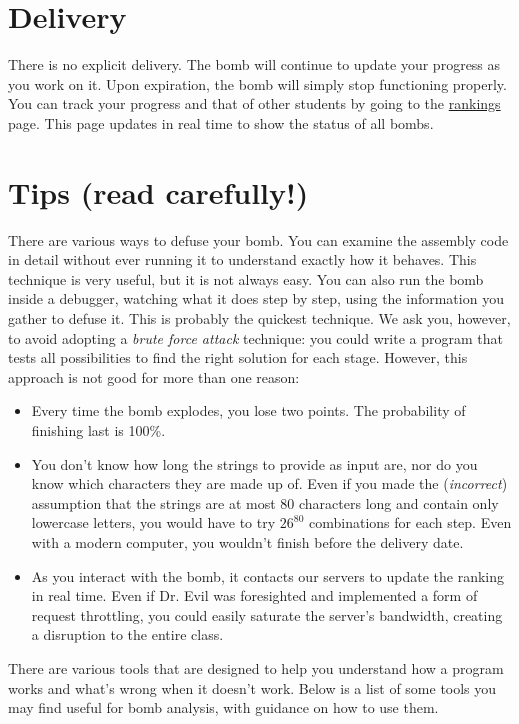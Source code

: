 \documentclass[a4paper,12pt]{report}  %
\begin{document}
\section{Delivery}
There is no explicit delivery.
The bomb will continue to update your progress as you work on it.
Upon expiration, the bomb will simply stop functioning properly.
You can track your progress and that of other students by going to the \href{https://bombs.alessandropellegrini.it/2425}{rankings} page.
This page updates in real time to show the status of all bombs.

\section{Tips (read carefully!)} \label{homework:tips}
There are various ways to defuse your bomb.
You can examine the assembly code in detail without ever running it to understand exactly how it behaves.
This technique is very useful, but it is not always easy.
You can also run the bomb inside a debugger, watching what it does step by step, using the information you gather to defuse it.
This is probably the quickest technique.
We ask you, however, to avoid adopting a \textit{brute force attack} technique: you could write a program that tests all possibilities to find the right solution for each stage.
However, this approach is not good for more than one reason:
\begin{itemize}
    \item Every time the bomb explodes, you lose two points. The probability of finishing last is 100\%.
    \item You don't know how long the strings to provide as input are, nor do you know which characters they are made up of. Even if you made the (\textit{incorrect}) assumption that the strings are at most 80 characters long and contain only lowercase letters, you would have to try $26^{80}$ combinations for each step. Even with a modern computer, you wouldn't finish before the delivery date.    
    \item As you interact with the bomb, it contacts our servers to update the ranking in real time. Even if Dr. Evil was foresighted and implemented a form of request throttling, you could easily saturate the server's bandwidth, creating a disruption to the entire class.
\end{itemize}
There are various tools that are designed to help you understand how a program works and what's wrong when it doesn't work.
Below is a list of some tools you may find useful for bomb analysis, with guidance on how to use them.
\end{document}
